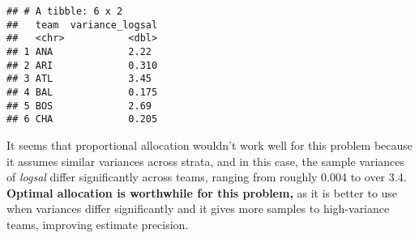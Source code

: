 \documentclass[]{article}
\begin{document}
\begin{enumerate}[label=(\alph*)]
\begin{verbatim}
## # A tibble: 6 x 2
##   team  variance_logsal
##   <chr>           <dbl>
## 1 ANA             2.22 
## 2 ARI             0.310
## 3 ATL             3.45 
## 4 BAL             0.175
## 5 BOS             2.69 
## 6 CHA             0.205
\end{verbatim}

It seems that proportional allocation wouldn't work well for this problem because it assumes similar variances across strata, and in this case, the sample variances of \textit{logsal} differ significantly across teams, ranging from roughly 0.004 to over 3.4. \textbf{Optimal allocation is worthwhile for this problem,} as it is better to use when variances differ significantly and it gives more samples to high-variance teams, improving estimate precision.

\end{enumerate}
\end{document}
